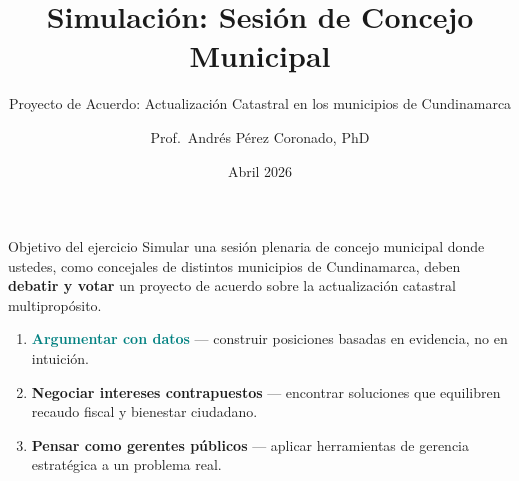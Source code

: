 \documentclass[aspectratio=169]{beamer}
\title{Simulación: Sesión de Concejo Municipal}
\subtitle{Proyecto de Acuerdo: Actualización Catastral en los municipios de Cundinamarca}
\author{Prof.~Andrés Pérez Coronado, PhD}
\institute{Especialización en Gobernanza y Desarrollo Territorial\\Universidad del Rosario}
\date{Abril 2026}
\begin{document}
\maketitle

\begin{frame}{Objetivo del ejercicio}
  \small
  Simular una sesión plenaria de concejo municipal donde ustedes, como
  concejales de distintos municipios de Cundinamarca, deben \textbf{debatir y
  votar} un proyecto de acuerdo sobre la actualización catastral
  multipropósito.
  \vspace{0.6em}

  \begin{enumerate}
    \item \textbf{\textcolor{teal}{Argumentar con datos}} --- construir
    posiciones basadas en evidencia, no en intuición.

    \item \textbf{\textcolor{accent}{Negociar intereses contrapuestos}}
    --- encontrar soluciones que equilibren recaudo fiscal y bienestar
    ciudadano.

    \item \textbf{\textcolor{verde}{Pensar como gerentes públicos}} ---
    aplicar herramientas de gerencia estratégica a un problema real.
  \end{enumerate}
\end{frame}
\end{document}

